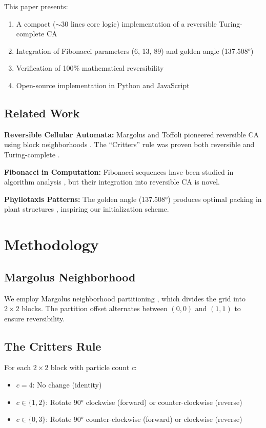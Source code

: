 \documentclass[11pt]{article}
\begin{document}
This paper presents:
\begin{enumerate}
\item A compact ($\sim$30 lines core logic) implementation of a reversible Turing-complete CA
\item Integration of Fibonacci parameters (6, 13, 89) and golden angle (137.508°)
\item Verification of 100\% mathematical reversibility
\item Open-source implementation in Python and JavaScript
\end{enumerate}

\subsection{Related Work}

\textbf{Reversible Cellular Automata:} Margolus and Toffoli pioneered reversible CA using block neighborhoods \cite{toffoli1987}. The ``Critters'' rule was proven both reversible and Turing-complete \cite{margolus1984}.

\textbf{Fibonacci in Computation:} Fibonacci sequences have been studied in algorithm analysis \cite{knuth1997}, but their integration into reversible CA is novel.

\textbf{Phyllotaxis Patterns:} The golden angle (137.508°) produces optimal packing in plant structures \cite{jean1994,douady1992}, inspiring our initialization scheme.

\section{Methodology}

\subsection{Margolus Neighborhood}

We employ Margolus neighborhood partitioning \cite{toffoli1987}, which divides the grid into $2\times2$ blocks. The partition offset alternates between $(0,0)$ and $(1,1)$ to ensure reversibility.

\subsection{The Critters Rule}

For each $2\times2$ block with particle count $c$:

\begin{itemize}
\item $c = 4$: No change (identity)
\item $c \in \{1,2\}$: Rotate 90° clockwise (forward) or counter-clockwise (reverse)
\item $c \in \{0,3\}$: Rotate 90° counter-clockwise (forward) or clockwise (reverse)
\end{itemize}
\end{document}
